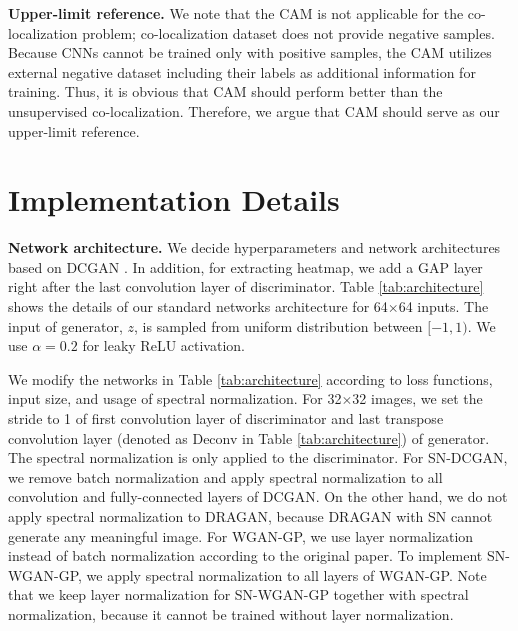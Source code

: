 \documentclass[runningheads]{llncs}
\begin{document}
\noindent\textbf{Upper-limit reference.} We note that the CAM is not applicable for the co-localization problem; co-localization dataset does not provide negative samples. Because CNNs cannot be trained only with positive samples, the CAM utilizes external negative dataset including their labels as additional information for training. Thus, it is obvious that CAM should perform better than the unsupervised co-localization. Therefore, we argue that CAM should serve as our upper-limit reference. 

\section{Implementation Details}
\label{sec:details}

\noindent\textbf{Network architecture.} We decide hyperparameters and network architectures based on DCGAN \cite{radford2015unsupervised}. In addition, for extracting heatmap, we add a GAP layer right after the last convolution layer of discriminator. Table \ref{tab:architecture} shows the details of our standard networks architecture for 64$\times$64 inputs. The input of generator, $z$, is sampled from uniform distribution between $[-1,1)$. We use $\alpha = 0.2$ for leaky ReLU activation.

We modify the networks in Table \ref{tab:architecture} according to loss functions, input size, and usage of spectral normalization. For 32$\times$32 images, we set the stride to 1 of first convolution layer of discriminator and last transpose convolution layer (denoted as Deconv in Table \ref{tab:architecture}) of generator. The spectral normalization \cite{miyato2018spectral} is only applied to the discriminator. For SN-DCGAN, we remove batch normalization \cite{ioffe2015batch} and apply spectral normalization to all convolution and fully-connected layers of DCGAN. On the other hand, we do not apply spectral normalization to DRAGAN, because DRAGAN with SN cannot generate any meaningful image. For WGAN-GP, we use layer normalization \cite{ba2016layer} instead of batch normalization according to the original paper. To implement SN-WGAN-GP, we apply spectral normalization to all layers of WGAN-GP. Note that we keep layer normalization for SN-WGAN-GP together with spectral normalization, because it cannot be trained without layer normalization.
\end{document}
